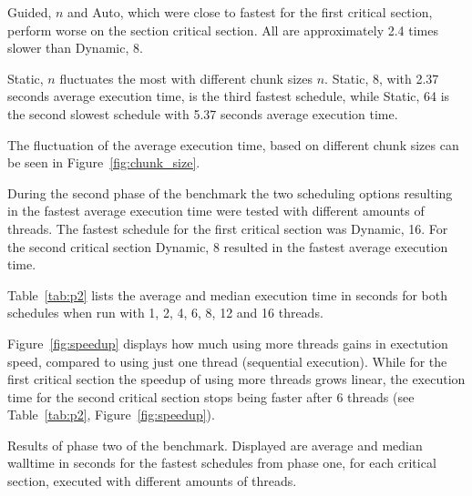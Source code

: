 \documentclass[twoside,11pt]{article}
\begin{document}
Guided, $n$ and Auto, which were close to fastest for
the first critical section, perform worse on the
section critical section. All are approximately 2.4 times
slower than Dynamic, 8.

Static, $n$ fluctuates the most with different chunk
sizes $n$.
Static, 8, with 2.37 seconds average execution time, is
the third fastest schedule, while Static, 64
is the second slowest schedule with 5.37 seconds
average execution time.

The fluctuation of the average execution time, based
on different chunk sizes can be seen in
Figure~\ref{fig:chunk_size}.

During the second phase of the benchmark the two scheduling
options resulting in the fastest average execution time
were tested with different amounts of threads.
The fastest schedule for the first critical
section was Dynamic, 16. For the second critical section
Dynamic, 8 resulted in the fastest average execution time.

Table~\ref{tab:p2} lists the average and median execution
time in seconds for both schedules when run
with 1, 2, 4, 6, 8, 12 and 16 threads.

Figure~\ref{fig:speedup} displays how much using more
threads gains in exectution speed, compared to using just
one thread (sequential execution).
While for the first critical section the speedup of using
more threads grows linear, the execution time for the
second critical section stops being faster after 6
threads (see Table~\ref{tab:p2}, Figure~\ref{fig:speedup}).

\begin{table}
\begin{center}

\caption{Results of phase two of the benchmark. Displayed
  are average and median walltime in seconds for the
  fastest schedules from phase one, for each
  critical section, executed with different amounts of
  threads.}
\label{tab:p2}
\end{center}
\end{table}
\end{document}
